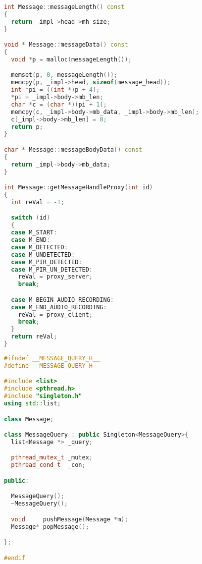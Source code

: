 \begin{lstlisting}[caption=message.cpp,language=C++]
int Message::messageLength() const
{
  return _impl->head->mh_size;
}

void * Message::messageData() const
{
  void *p = malloc(messageLength());

  memset(p, 0, messageLength());
  memcpy(p, _impl->head, sizeof(message_head));
  int *pi = ((int *)p + 4);
  *pi = _impl->body->mb_len;
  char *c = (char *)(pi + 1);
  memcpy(c, _impl->body->mb_data, _impl->body->mb_len);
  c[_impl->body->mb_len] = 0;
  return p;
}

char * Message::messageBodyData() const
{
  return _impl->body->mb_data;
}

int Message::getMessageHandleProxy(int id)
{
  int reVal = -1;

  switch (id)
  {
  case M_START:
  case M_END:
  case M_DETECTED:
  case M_UNDETECTED:
  case M_PIR_DETECTED:
  case M_PIR_UN_DETECTED:
    reVal = proxy_server;
    break;

  case M_BEGIN_AUDIO_RECORDING:
  case M_END_AUDIO_RECORDING:
    reVal = proxy_client;
    break;
  }
  return reVal;
}
\end{lstlisting}





\begin{lstlisting}[caption=message-query.cpp,language=C++]
#ifndef __MESSAGE_QUERY_H__
#define __MESSAGE_QUERY_H__

#include <list>
#include <pthread.h>
#include "singleton.h"
using std::list;

class Message;

class MessageQuery : public Singleton<MessageQuery>{
  list<Message *> _query;

  pthread_mutex_t _mutex;
  pthread_cond_t  _con;

public:

  MessageQuery();
  ~MessageQuery();

  void     pushMessage(Message *m);
  Message* popMessage();

};

#endif

\end{lstlisting}





